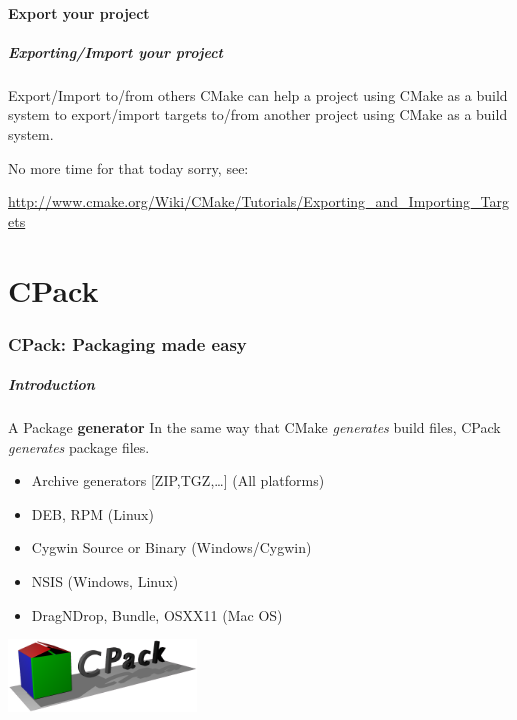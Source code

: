 \documentclass[compress,slidestop,table
              ]
               {beamer}
\begin{document}
\subsection{Export your project}
\begin{frame}
\frametitle{Exporting/Import your project}

\begin{block}{Export/Import to/from others}
CMake can help a project using CMake as a build system to
export/import targets to/from another project using CMake
as a build system.
\end{block}

No more time for that today sorry, see:

\url{http://www.cmake.org/Wiki/CMake/Tutorials/Exporting_and_Importing_Targets}
\end{frame}

\part{CPack}

\section{CPack: Packaging made easy}
\begin{frame}
\frametitle{Introduction}
\begin{block}{A Package \textbf{generator}}
In the same way that CMake \emph{generates} build files, CPack
\emph{generates} package files.
\end{block}

\begin{multicols}{2}
\begin{itemize}
\item Archive generators [ZIP,TGZ,\ldots] (All platforms)
\item DEB, RPM (Linux)
\item Cygwin Source or Binary (Windows/Cygwin)
\item NSIS (Windows, Linux)
\item DragNDrop, Bundle, OSXX11 (Mac OS)
\end{itemize}
\columnbreak
\includegraphics[width=5cm]{figures/CPack-logo-3D-opened-v2} \\
\end{multicols}
\end{frame}
\end{document}
